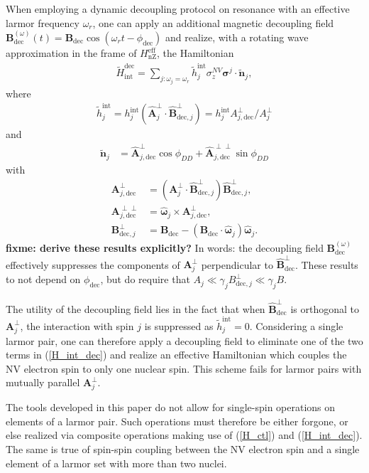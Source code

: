 \documentclass[twocolumn]{revtex4}
\renewcommand{\t}{\text} %
\newcommand{\p}[1]{\left(#1\right)} %
\renewcommand{\v}{\bm} %
\newcommand{\uv}[1]{\hat{\v{#1}}} %
\renewcommand{\c}{\cdot} %
\newcommand{\fixme}[1]{{\bf \color{red} fixme: #1}}
\begin{document}
When employing a dynamic decoupling protocol on resonance with an
effective larmor frequency $\omega_r$, one can apply an additional
magnetic decoupling field
$\v B_\t{dec}^{\p\omega}\p{t}=\v B_\t{dec}\cos\p{\omega_r
  t-\phi_\t{dec}}$ and realize, with a rotating wave approximation in
the frame of $H_\t{nZ}^\t{eff}$, the Hamiltonian
\begin{align}
  \tilde H_\t{int}^\t{dec} = \sum_{j:\omega_j=\omega_r}
  \tilde h_j^\t{int}\sigma_z^{NV}\v\sigma^j\c\tilde{\v n}_j,
  \label{H_int_dec}
\end{align}
where
\begin{align}
  \tilde h_j^\t{int}
  = h_j^\t{int}\p{\uv A_j^\perp\c\uv B_{\t{dec},j}^\perp}
  = h_j^\t{int}A_{j,\t{dec}}^\perp/A_j^\perp
\end{align}
and
\begin{align}
  \tilde{\v n}_j
  &= \uv A_{j,\t{dec}}^\perp\cos\phi_{DD}
    + \uv A_{j,\t{dec}}^{\perp\perp}\sin\phi_{DD}
\end{align}
with
\begin{align}
  \v A_{j,\t{dec}}^\perp
  &= \p{\v A_j^{\perp}\c\uv B_{\t{dec},j}^\perp}\uv B_{\t{dec},j}^\perp, \\
  \v A_{j,\t{dec}}^{\perp\perp}
  &= \uv\omega_j\times\v A_{j,\t{dec}}^\perp, \\
  \v B_{\t{dec},j}^\perp
  &= \v B_\t{dec} - \p{\v B_\t{dec}\c\uv\omega_j}\uv\omega_j.
\end{align} \fixme{derive these results explicitly?}
In words: the decoupling field $\v B_\t{dec}^{\p\omega}$ effectively
suppresses the components of $\v A_j^\perp$ perpendicular to
$\uv B_\t{dec}^\perp$. These results to not depend on $\phi_\t{dec}$,
but do require that $A_j\ll\gamma_jB_{\t{dec},j}^\perp\ll\gamma_jB$.

The utility of the decoupling field lies in the fact that when
$\uv B_\t{dec}^\perp$ is orthogonal to $\v A_j^\perp$, the interaction
with spin $j$ is suppressed as $\tilde h_j^\t{int}=0$. Considering a
single larmor pair, one can therefore apply a decoupling field to
eliminate one of the two terms in (\ref{H_int_dec}) and realize an
effective Hamiltonian which couples the NV electron spin to only one
nuclear spin. This scheme fails for larmor pairs with mutually
parallel $\v A_j^\perp$.

The tools developed in this paper do not allow for single-spin
operations on elements of a larmor pair. Such operations must
therefore be either forgone, or else realized via composite operations
making use of (\ref{H_ctl}) and (\ref{H_int_dec}). The same is true of
spin-spin coupling between the NV electron spin and a single element
of a larmor set with more than two nuclei.
\end{document}
